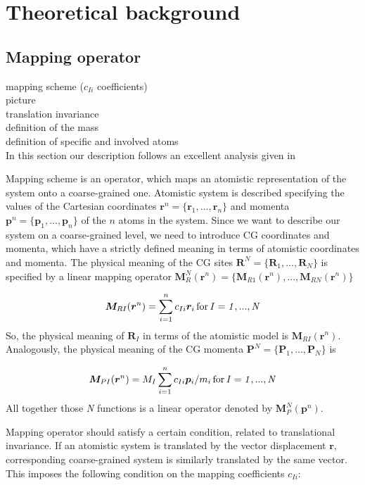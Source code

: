 \chapter{Theoretical background}

\section{Mapping operator}
\label{sec:mapping_operator}
\sasha
mapping scheme ($c_{Ii}$ coefficients) \\
picture \\
translation invariance \\
definition of the mass \\
definition of specific and involved atoms \\

In this section our description follows an excellent analysis given in \cite{Noid:2008.1}

Mapping scheme is an operator, which maps an atomistic representation of the system onto a coarse-grained one.
Atomistic system is described specifying the values of the Cartesian coordinates $\bm r^n = \{\bm r_1,...,\bm r_n\}$ and momenta 
$\bm p^n = \{\bm p_1,...,\bm p_n\}$ of the $n$ atoms in the system. Since we want to describe our system on a coarse-grained level, we need to introduce CG coordinates and momenta, which have a strictly defined meaning in terms of atomistic coordinates and momenta. The physical meaning of the CG sites $\bm R^N = \{\bm R_1,...,\bm R_N\}$ is specified by a linear mapping operator
$\bm M_R^N(\bm r^n) = \{\bm M_{R1}(\bm r^n),...,\bm M_{RN}(\bm r^n)\}$

\begin{equation}
 \bm M_{RI}(\bm r^n)=\sum_{i=1}^{n}c_{Ii}\bm r_i \, \rm for\, \it I = 1,...,N
\label{eq:mapping_scheme}
\end{equation}
So, the physical meaning of $\bm R_I$ in terms of the atomistic model is $\bm M_{RI}(\bm r^n)$.
Analogously, the physical meaning of the CG momenta $\bm P^N = \{\bm P_1,...,\bm P_N\}$ is 

\begin{equation}
 \bm M_{PI}(\bm r^n)=M_I\sum_{i=1}^{n}c_{Ii}\bm p_i/m_i \, \rm for\, \it I = 1,...,N
\end{equation}
All together those {\it N} functions is a linear operator denoted by $\bm M_P^N(\bm p^n)$.

Mapping operator should satisfy a certain condition, related to translational invariance. If an atomistic system is translated by the vector displacement $\bm r $, corresponding coarse-grained system is similarly translated by the same vector. This imposes the following condition on the mapping coefficients $ c_{Ii} $:

